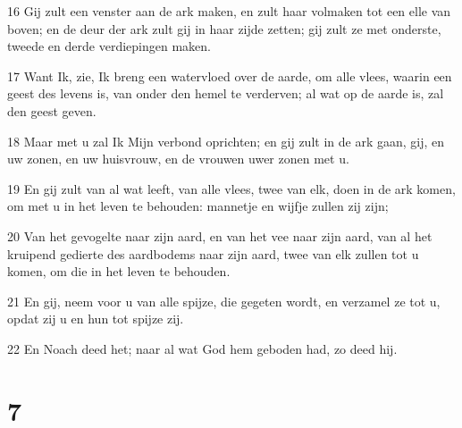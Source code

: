 \par 16 Gij zult een venster aan de ark maken, en zult haar volmaken tot een elle van boven; en de deur der ark zult gij in haar zijde zetten; gij zult ze met onderste, tweede en derde verdiepingen maken.
\par 17 Want Ik, zie, Ik breng een watervloed over de aarde, om alle vlees, waarin een geest des levens is, van onder den hemel te verderven; al wat op de aarde is, zal den geest geven.
\par 18 Maar met u zal Ik Mijn verbond oprichten; en gij zult in de ark gaan, gij, en uw zonen, en uw huisvrouw, en de vrouwen uwer zonen met u.
\par 19 En gij zult van al wat leeft, van alle vlees, twee van elk, doen in de ark komen, om met u in het leven te behouden: mannetje en wijfje zullen zij zijn;
\par 20 Van het gevogelte naar zijn aard, en van het vee naar zijn aard, van al het kruipend gedierte des aardbodems naar zijn aard, twee van elk zullen tot u komen, om die in het leven te behouden.
\par 21 En gij, neem voor u van alle spijze, die gegeten wordt, en verzamel ze tot u, opdat zij u en hun tot spijze zij.
\par 22 En Noach deed het; naar al wat God hem geboden had, zo deed hij.

\chapter{7}

